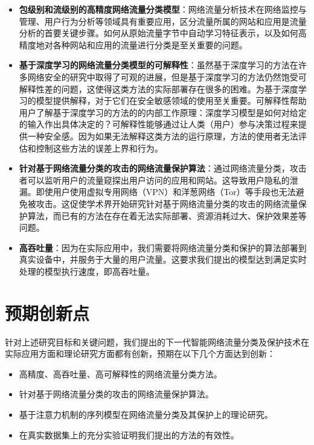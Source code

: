 \documentclass[degree=master,cjk-font=noto]{thuthesis}
\begin{document}
\begin{itemize}
	\item \textbf{包级别和流级别的高精度网络流量分类模型}：网络流量分析技术在网络监控与管理、用户行为分析等领域具有重要应用，区分流量所属的网站和应用是流量分析的首要关键步骤。如何从原始流量字节中自动学习特征表示，以及如何高精度地对各种网站和应用的流量进行分类是至关重要的问题。
	\item \textbf{基于深度学习的网络流量分类模型的可解释性}：虽然基于深度学习的方法在许多网络安全的研究中取得了可观的进展，但是基于深度学习的方法仍然饱受可解释性差的问题，这使得这类方法的实际部署存在很多的困难。为基于深度学习的模型提供解释，对于它们在安全敏感领域的使用至关重要。可解释性帮助用户了解基于深度学习的方法的的内部工作原理：深度学习模型是如何对给定的输入作出具体决定的？可解释性能够通过让人类（用户）参与决策过程来提供一种安全感。因为如果无法解释这类方法的运行原理，方法的使用者无法评估和控制这些方法的误差上界和行为。
	\item \textbf{针对基于网络流量分类的攻击的网络流量保护算法}：通过网络流量分类，攻击者可以监听用户的流量窥探出用户访问的应用和网站。这导致用户隐私的泄漏。即使用户使用虚拟专用网络（VPN）和洋葱网络（Tor）等手段也无法避免被攻击。这促使学术界开始研究针对基于网络流量分类的攻击的网络流量保护算法，而已有的方法在存在着无法实际部署、资源消耗过大、保护效果差等问题。
	\item \textbf{高吞吐量}：因为在实际应用中，我们需要将网络流量分类和保护的算法部署到真实设备中，并服务于大量的用户流量。这要求我们提出的模型达到满足实时处理的模型执行速度，即高吞吐量。
\end{itemize}


\section{预期创新点}

针对上述研究目标和关键问题，我们提出的下一代智能网络流量分类及保护技术在实际应用方面和理论研究方面都有创新，预期在以下几个方面达到创新：

\begin{itemize}
	\item 高精度、高吞吐量、高可解释性的网络流量分类方法。
	\item 针对基于网络流量分类的攻击的网络流量保护算法。
	\item 基于注意力机制的序列模型在网络流量分类及其保护上的理论研究。
	\item 在真实数据集上的充分实验证明我们提出的方法的有效性。
\end{itemize}
\end{document}
